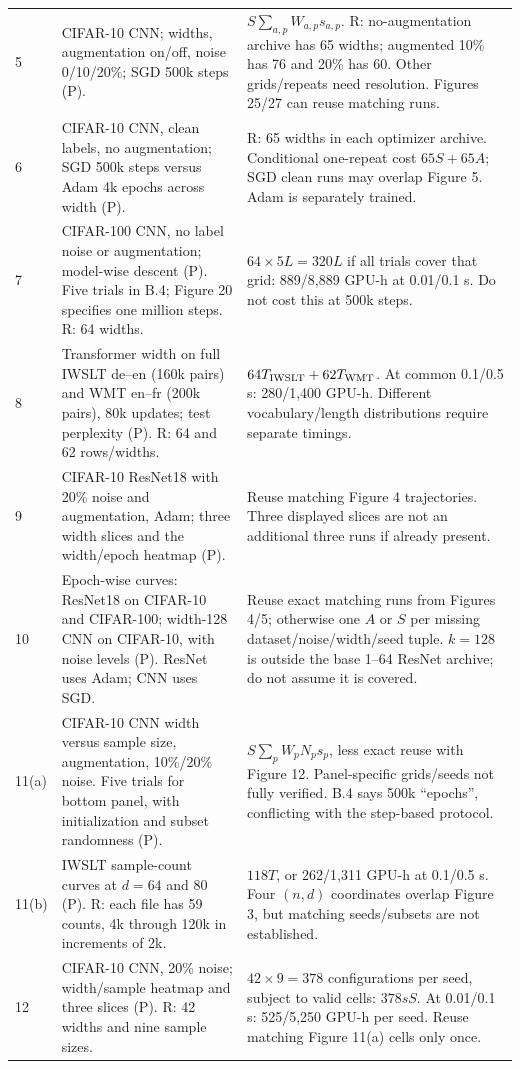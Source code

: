 \documentclass{article}
\begin{document}
\begin{longtable}{@{}P{0.32in}P{3.47in}P{2.9in}@{}}
5 & CIFAR-10 CNN; widths, augmentation on/off, noise 0/10/20\%; SGD 500k steps (P). & $S\sum_{a,p}W_{a,p}s_{a,p}$. R: no-augmentation archive has 65 widths; augmented 10\% has 76 and 20\% has 60. Other grids/repeats need resolution. Figures 25/27 can reuse matching runs.\\
6 & CIFAR-10 CNN, clean labels, no augmentation; SGD 500k steps versus Adam 4k epochs across width (P). & R: 65 widths in each optimizer archive. Conditional one-repeat cost $65S+65A$; SGD clean runs may overlap Figure 5. Adam is separately trained.\\
7 & CIFAR-100 CNN, no label noise or augmentation; model-wise descent (P). Five trials in B.4; Figure 20 specifies one million steps. R: 64 widths. & $64\times5L=320L$ if all trials cover that grid: 889/8,889 GPU-h at 0.01/0.1 s. Do not cost this at 500k steps.\\
8 & Transformer width on full IWSLT de--en (160k pairs) and WMT en--fr (200k pairs), 80k updates; test perplexity (P). R: 64 and 62 rows/widths. & $64T_{\rm IWSLT}+62T_{\rm WMT}$. At common 0.1/0.5 s: 280/1,400 GPU-h. Different vocabulary/length distributions require separate timings.\\
9 & CIFAR-10 ResNet18 with 20\% noise and augmentation, Adam; three width slices and the width/epoch heatmap (P). & Reuse matching Figure 4 trajectories. Three displayed slices are not an additional three runs if already present.\\
10 & Epoch-wise curves: ResNet18 on CIFAR-10 and CIFAR-100; width-128 CNN on CIFAR-10, with noise levels (P). ResNet uses Adam; CNN uses SGD. & Reuse exact matching runs from Figures 4/5; otherwise one $A$ or $S$ per missing dataset/noise/width/seed tuple. $k=128$ is outside the base 1--64 ResNet archive; do not assume it is covered.\\
11(a) & CIFAR-10 CNN width versus sample size, augmentation, 10\%/20\% noise. Five trials for bottom panel, with initialization and subset randomness (P). & $S\sum_p W_pN_ps_p$, less exact reuse with Figure 12. Panel-specific grids/seeds not fully verified. B.4 says 500k ``epochs'', conflicting with the step-based protocol.\\
11(b) & IWSLT sample-count curves at $d=64$ and $80$ (P). R: each file has 59 counts, 4k through 120k in increments of 2k. & $118T$, or 262/1,311 GPU-h at 0.1/0.5 s. Four $(n,d)$ coordinates overlap Figure 3, but matching seeds/subsets are not established.\\
12 & CIFAR-10 CNN, 20\% noise; width/sample heatmap and three slices (P). R: 42 widths and nine sample sizes. & $42\times9=378$ configurations per seed, subject to valid cells: $378sS$. At 0.01/0.1 s: 525/5,250 GPU-h per seed. Reuse matching Figure 11(a) cells only once.\\

\end{longtable}
\end{document}
